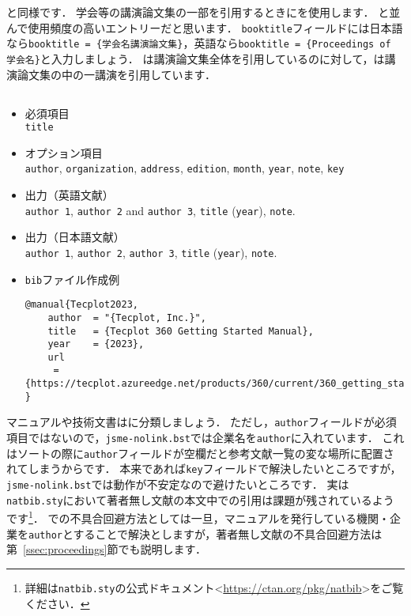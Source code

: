 \documentclass[a4paper,fleqn,uplatex,dvipdfmx]{jsarticle}
\newcommand{\jsmefile}{\texttt{jsme-nolink.bst}}
\begin{document}
\ttconference と同様です．
学会等の講演論文集の一部を引用するときに\ttinproceedings を使用します．
\ttarticle と並んで使用頻度の高いエントリーだと思います．
\verb|booktitle|フィールドには日本語なら\texttt{booktitle = \{\colorbox[gray]{0.8}{学会名}講演論文集\}}，英語なら\texttt{booktitle = \{Proceedings of \colorbox[gray]{0.8}{学会名}\}}と入力しましょう．
\ttproceedings は講演論文集全体を引用しているのに対して，\ttinproceedings は講演論文集の中の一講演を引用しています．


\subsection{\ttmanual}
\label{ssec:manual}
\begin{screen}
    \begin{itemize}
        \item 必須項目 \\
        \verb|title|
        \item オプション項目 \\
        \verb|author|, \verb|organization|, \verb|address|, \verb|edition|, \verb|month|, \verb|year|, \verb|note|, \verb|key|
        \item 出力（英語文献） \\
            \colorbox[gray]{0.8}{\texttt{author 1}}, \colorbox[gray]{0.8}{\texttt{author 2}} and \colorbox[gray]{0.8}{\texttt{author 3}}, \colorbox[gray]{0.8}{\texttt{title}} (\colorbox[gray]{0.8}{\texttt{year}}), \colorbox[gray]{0.8}{\texttt{note}}.
        \item 出力（日本語文献） \\
            \colorbox[gray]{0.8}{\texttt{author 1}}, \colorbox[gray]{0.8}{\texttt{author 2}}, \colorbox[gray]{0.8}{\texttt{author 3}}, \colorbox[gray]{0.8}{\texttt{title}} (\colorbox[gray]{0.8}{\texttt{year}}), \colorbox[gray]{0.8}{\texttt{note}}.
        \item \verb|bib|ファイル作成例 \vspace{-3mm}
\begin{verbatim}
@manual{Tecplot2023,
    author  = "{Tecplot, Inc.}",
    title   = {Tecplot 360 Getting Started Manual},
    year    = {2023},
    url    
     = {https://tecplot.azureedge.net/products/360/current/360_getting_started.pdf}
}
\end{verbatim}
    \end{itemize}
\end{screen}

マニュアルや技術文書は\ttmanual に分類しましょう．
ただし，\verb|author|フィールドが必須項目ではないので，\jsmefile では企業名を\verb|author|に入れています．
これはソートの際に\verb|author|フィールドが空欄だと参考文献一覧の変な場所に配置されてしまうからです．
本来であれば\verb|key|フィールドで解決したいところですが，\jsmefile では動作が不安定なので避けたいところです．
実は\verb|natbib.sty|において著者無し文献の本文中での引用は課題が残されているようです\footnote{詳細は\verb|natbib.sty|の公式ドキュメント\textless\url{https://ctan.org/pkg/natbib}\textgreater をご覧ください．}．
\ttmanual での不具合回避方法としては一旦，マニュアルを発行している機関・企業を\verb|author|とすることで解決としますが，著者無し文献の不具合回避方法は第~\ref{ssec:proceedings}節\ttproceedings でも説明します．
\end{document}
